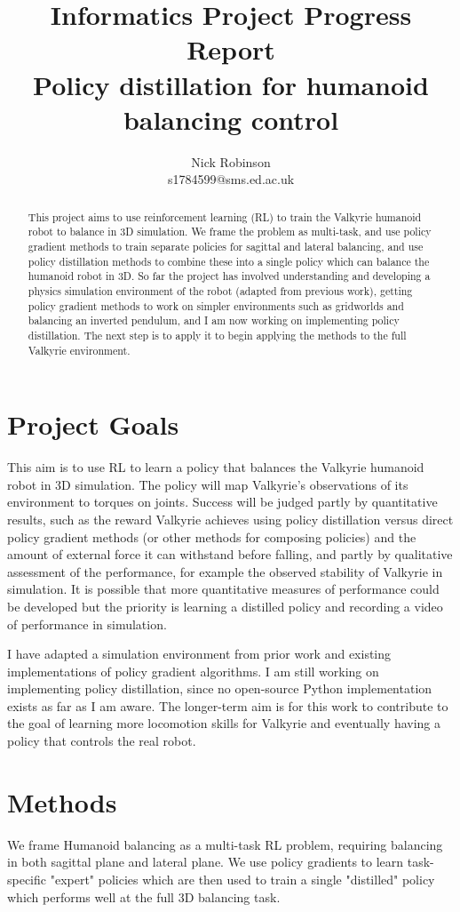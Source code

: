\documentclass[a4paper]{article}
\title{Informatics Project Progress Report\\Policy distillation for humanoid balancing control}
\author{Nick Robinson\\s1784599@sms.ed.ac.uk}
\date{}
\begin{document}
\maketitle

\begin{abstract}
This project aims to use reinforcement learning (RL) to train the Valkyrie humanoid robot to balance in 3D simulation. 
We frame the problem as multi-task, and use policy gradient methods to train separate policies for sagittal and lateral balancing, 
and use policy distillation methods to combine these into a single policy which can balance the humanoid robot in 3D.
So far the project has involved understanding and developing a physics simulation environment of the robot (adapted from previous work), 
 getting policy gradient methods to work on simpler environments such as gridworlds and balancing an inverted pendulum,
 and I am now working on implementing policy distillation. The next step is to apply it to begin applying the methods to the full Valkyrie environment. 
\end{abstract}


\section{Project Goals}
This aim is to use RL to learn a policy that balances the Valkyrie humanoid robot in 3D simulation. 
The policy will map Valkyrie's observations of its environment to torques on joints.
Success will be judged partly by quantitative results, such as the reward Valkyrie achieves using policy distillation versus direct policy gradient methods (or other methods for composing policies) and the amount of external force it can withstand before falling, and partly by qualitative assessment of the performance, for example the observed stability of Valkyrie in simulation. It is possible that more quantitative measures of performance could be developed but the priority is learning a distilled policy and recording a video of performance in simulation. 

I have adapted a simulation environment from prior work and existing implementations of policy gradient algorithms. I am still working on implementing policy distillation, since no open-source Python implementation exists as far as I am aware. The longer-term aim is for this work to contribute to the goal of learning more locomotion skills for Valkyrie and eventually having a policy that controls the real robot. 

\section{Methods}
We frame Humanoid balancing as a multi-task RL problem, requiring balancing in both sagittal plane and lateral plane.  We use policy gradients to learn task-specific "expert" policies which are then used to train a single "distilled" policy which performs well at the full 3D balancing task. 
\end{document}
